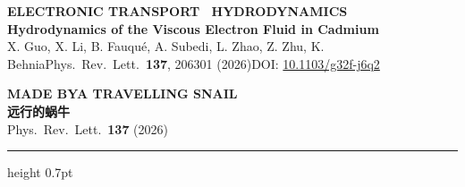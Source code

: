 \documentclass[10pt]{article}
\newcommand{\eyebrow}[1]{{\sffamily\bfseries\fontsize{9.7}{11.8}\selectfont\color{Teal}\MakeUppercase{#1}}}
\newcommand{\smallnote}[1]{{\fontsize{9.4}{11.3}\selectfont\color{Muted}#1}}
\begin{document}
\noindent{\color{Teal}\rule{\textwidth}{2.2pt}}\par
\vspace{5pt}

\begin{minipage}[b]{0.74\textwidth}
	{\eyebrow{Electronic transport \textbullet\ Hydrodynamics}}\\[1pt]
	{\sffamily\bfseries\fontsize{30.2}{33.5}\selectfont\color{Ink}Hydrodynamics of the Viscous Electron Fluid in Cadmium}\\[3pt]
	{\fontsize{10.9}{13.2}\selectfont\color{Muted}X. Guo, X. Li, B. Fauqu\'e, A. Subedi, L. Zhao, Z. Zhu, K. Behnia\quad\textbullet\quad Phys.\ Rev.\ Lett.\ \textbf{137}, 206301 (2026)\quad\textbullet\quad DOI: \href{https://doi.org/10.1103/g32f-j6q2}{10.1103/g32f-j6q2}}
\end{minipage}\hfill
\begin{minipage}[b]{0.23\textwidth}\raggedleft
	{\colorbox{Badge}{\color{white}\sffamily\bfseries\fontsize{11.8}{14.2}\selectfont\hspace{5pt}MADE BY\quad A TRAVELLING SNAIL\hspace{5pt}}}\\[3pt]
	{\sffamily\bfseries\fontsize{22.4}{24.8}\selectfont\color{Teal} 远行的蜗牛}\\[1pt]
	{\smallnote{Phys.\ Rev.\ Lett.\ \textbf{137} (2026)}}
\end{minipage}

\vspace{5pt}\par{\color{Line}\hrule height 0.7pt}\par
\vspace{7pt}
\end{document}
